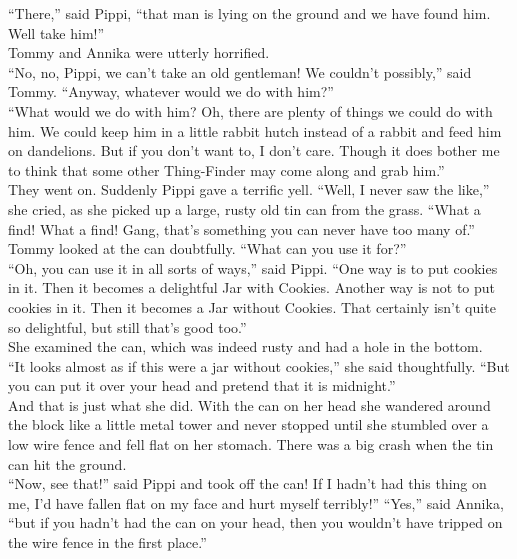 \documentclass{standard}
\begin{document}
``There,” said Pippi, ``that man is lying on the ground and we have found him. Well take him!”\\

Tommy and Annika were utterly horrified.\\

``No, no, Pippi, we can’t take an old gentleman! We couldn’t possibly,” said Tommy. ``Anyway, whatever would we do with him?”\\

``What would we do with him? Oh, there are plenty of things we could do with him. We could keep him in a little rabbit hutch instead of a rabbit and feed him on dandelions. But if you don’t want to, I don’t care. Though it does bother me to think that some other Thing-Finder may come along and grab him.”\\

They went on. Suddenly Pippi gave a terrific yell. ``Well, I never saw the like,” she cried, as she picked up a large, rusty old tin can from the grass. ``What a find! What a find! Gang, that’s something you can never have too many of.”\\

Tommy looked at the can doubtfully. ``What can you use it for?”\\

``Oh, you can use it in all sorts of ways,” said Pippi. ``One way is to put cookies in it. Then it becomes a delightful Jar with Cookies. Another way is not to put cookies in it. Then it becomes a Jar without Cookies. That certainly isn’t quite so delightful, but still that’s good too.”\\

She examined the can, which was indeed rusty and had a hole in the bottom.\\

``It looks almost as if this were a jar without cookies,” she said thoughtfully. ``But you can put it over your head and pretend that it is midnight.”\\

And that is just what she did. With the can on her head she wandered around the block like a little metal tower and never stopped until she stumbled over a low wire fence and fell flat on her stomach. There was a big crash when the tin can hit the ground.\\

``Now, see that!” said Pippi and took off the can! If I hadn’t had this thing on me, I’d have fallen flat on my face and hurt myself terribly!”
``Yes,” said Annika, ``but if you hadn’t had the can on your head, then you wouldn’t have tripped on the wire fence in the first place.”\\
\end{document}
